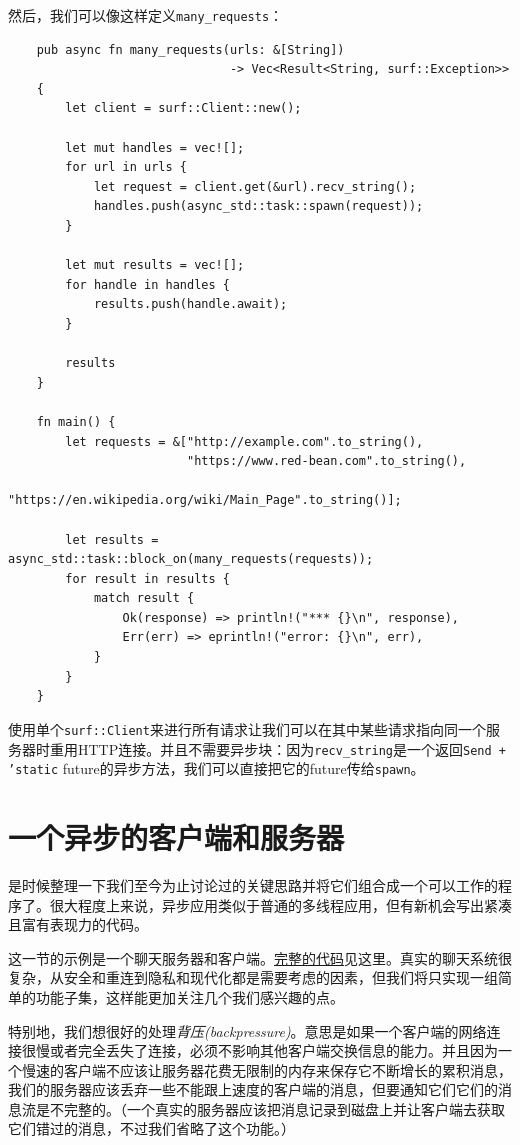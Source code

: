 然后，我们可以像这样定义\texttt{many\_requests}：
\begin{verbatim}
    pub async fn many_requests(urls: &[String])
                               -> Vec<Result<String, surf::Exception>>
    {
        let client = surf::Client::new();

        let mut handles = vec![];
        for url in urls {
            let request = client.get(&url).recv_string();
            handles.push(async_std::task::spawn(request));
        }

        let mut results = vec![];
        for handle in handles {
            results.push(handle.await);
        }

        results
    }

    fn main() {
        let requests = &["http://example.com".to_string(),
                         "https://www.red-bean.com".to_string(),
                         "https://en.wikipedia.org/wiki/Main_Page".to_string()];

        let results = async_std::task::block_on(many_requests(requests));
        for result in results {
            match result {
                Ok(response) => println!("*** {}\n", response),
                Err(err) => eprintln!("error: {}\n", err),
            }
        }
    }
\end{verbatim}

使用单个\texttt{surf::Client}来进行所有请求让我们可以在其中某些请求指向同一个服务器时重用HTTP连接。并且不需要异步块：因为\texttt{recv\_string}是一个返回\texttt{Send + 'static} future的异步方法，我们可以直接把它的future传给\texttt{spawn}。

\section{一个异步的客户端和服务器}
是时候整理一下我们至今为止讨论过的关键思路并将它们组合成一个可以工作的程序了。很大程度上来说，异步应用类似于普通的多线程应用，但有新机会写出紧凑且富有表现力的代码。

这一节的示例是一个聊天服务器和客户端。\href{https://github.com/ProgrammingRust/async-chat}{完整的代码}见这里。真实的聊天系统很复杂，从安全和重连到隐私和现代化都是需要考虑的因素，但我们将只实现一组简单的功能子集，这样能更加关注几个我们感兴趣的点。

特别地，我们想很好的处理\emph{背压(backpressure)}。意思是如果一个客户端的网络连接很慢或者完全丢失了连接，必须不影响其他客户端交换信息的能力。并且因为一个慢速的客户端不应该让服务器花费无限制的内存来保存它不断增长的累积消息，我们的服务器应该丢弃一些不能跟上速度的客户端的消息，但要通知它们它们的消息流是不完整的。（一个真实的服务器应该把消息记录到磁盘上并让客户端去获取它们错过的消息，不过我们省略了这个功能。）

